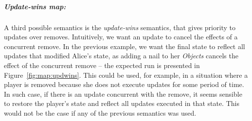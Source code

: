 \documentclass[12pt]{article}
\begin{document}
\subparagraph{Update-wins map:}

A third possible semantics is the \emph{update-wins} semantics, that gives
priority to updates over removes. 
Intuitively, we want an update to cancel the effects of a concurrent remove. 
In the previous example, we want the final state to reflect all updates that 
modified Alice's state, as adding a nail to her \emph{Objects} cancels the effect 
of the concurrent remove -- the expected run is presented in Figure~\ref{fig:map:updwins}.
This could be used, for example, in a situation where a player is removed because she 
does not execute updates for some period of time. 
In such case, if there is an update concurrent with the remove, it seems sensible
to restore the player's state and reflect all updates executed in that state. 
This would not be the case if any of the previous semantics was used.

\end{document}
